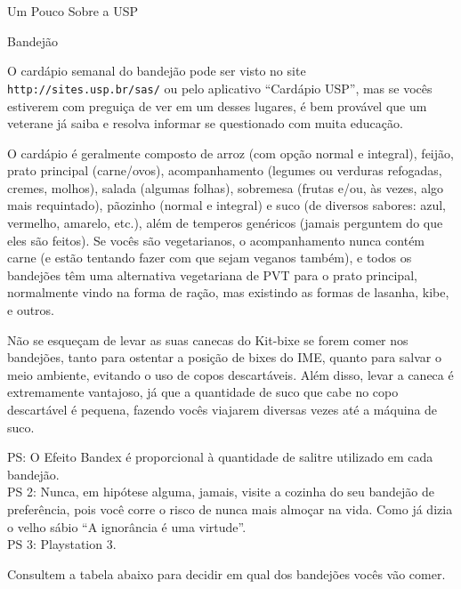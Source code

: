 \begin{secao}{Um Pouco Sobre a USP}
\begin{subsecao}{Bandejão}

O cardápio semanal do bandejão pode ser visto no site {\tt
http://sites.usp.br/sas/} ou pelo aplicativo ``Cardápio USP'', mas se vocês
estiverem com preguiça de ver em um desses lugares, é
bem provável que um veterane já saiba e resolva informar se questionado com muita
educação.

O cardápio é geralmente composto de arroz (com opção normal e integral), feijão,
prato principal (carne/ovos), acompanhamento (legumes ou verduras refogadas,
cremes, molhos), salada (algumas folhas), sobremesa (frutas e/ou, às vezes, algo mais
requintado), pãozinho (normal e integral) e suco (de diversos sabores: azul, vermelho,
amarelo, etc.), além de temperos genéricos
(jamais perguntem do que eles são feitos). Se vocês são vegetarianos, o
acompanhamento nunca contém carne (e estão tentando fazer com que sejam veganos
também), e todos os bandejões têm uma alternativa vegetariana de PVT para o
prato principal, normalmente vindo na forma de ração, mas existindo as formas
de lasanha, kibe, e outros.


Não se esqueçam de levar as suas canecas do Kit-bixe se forem comer nos
bandejões, tanto para ostentar a posição de bixes do IME, quanto para salvar o
meio ambiente, evitando o uso de copos descartáveis. Além disso, levar a caneca
é extremamente vantajoso, já que a quantidade de suco que cabe no copo
descartável é pequena, fazendo vocês viajarem diversas vezes até a máquina de
suco.

PS: O Efeito Bandex é proporcional à quantidade de salitre utilizado em cada
bandejão.\\
PS 2: Nunca, em hipótese alguma, jamais, visite a cozinha do seu bandejão de
preferência, pois você corre o risco de nunca mais almoçar na vida. Como já
dizia o velho sábio ``A ignorância é uma virtude''.\\
PS 3: Playstation 3.

Consultem a tabela abaixo para decidir em qual dos bandejões vocês vão comer.


\end{subsecao}
\end{secao}
